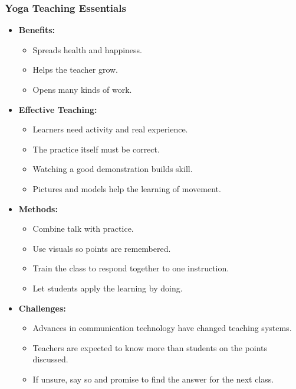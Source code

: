 \begin{frame}[fragile]\frametitle{Yoga Teaching Essentials}

    \begin{itemize}
        \item \textbf{Benefits:} 
          \begin{itemize}
              \item Spreads health and happiness.
              \item Helps the teacher grow.
              \item Opens many kinds of work.
          \end{itemize}

        \item \textbf{Effective Teaching:}
          \begin{itemize}
              \item Learners need activity and real experience.
              \item The practice itself must be correct.
              \item Watching a good demonstration builds skill.
              \item Pictures and models help the learning of movement.
          \end{itemize}

        \item \textbf{Methods:}
          \begin{itemize}
              \item Combine talk with practice.
              \item Use visuals so points are remembered.
              \item Train the class to respond together to one instruction.
              \item Let students apply the learning by doing.
          \end{itemize}

        \item \textbf{Challenges:}
          \begin{itemize}
              \item Advances in communication technology have changed teaching systems.
              \item Teachers are expected to know more than students on the points discussed.
              \item If unsure, say so and promise to find the answer for the next class.
          \end{itemize}

    \end{itemize}

\end{frame}

